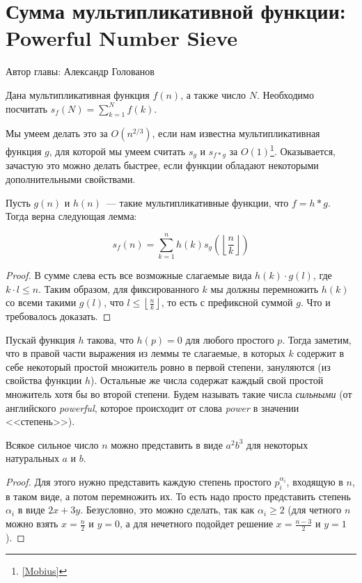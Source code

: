 \chapter{Сумма мультипликативной функции: Powerful Number Sieve}

Автор главы: Александр Голованов

\begin{problem}
 Дана мультипликативная функция $f(n)$, а также число $N$. Необходимо посчитать $s_f(N) = \sum_{k=1}^Nf(k)$.
\end{problem}


Мы умеем делать это за $O(n^{2/3})$, если нам известна мультипликативная функция $g$, для которой мы умеем считать $s_g$ и $s_{f*g}$ за $O(1)$\footnote{\ref{Mobius}}. Оказывается, зачастую это можно делать быстрее, если функции обладают некоторыми дополнительными свойствами.

Пусть $g(n)$ и $h(n)$~--- такие мультипликативные функции, что $f = h*g$. Тогда верна следующая лемма:

\begin{lemma}
    $$s_f(n) = \sum_{k=1}^nh(k)s_g\left(\left\lfloor\frac{n}{k}\right\rfloor\right)$$
\end{lemma}

\begin{proof}
    В сумме слева есть все возможные слагаемые вида $h(k) \cdot g(l)$, где $k \cdot l \le n$. Таким образом, для фиксированного $k$ мы должны перемножить $h(k)$ со всеми такими $g(l)$, что $l \le \left\lfloor \frac{n}{k} \right\rfloor$, то есть с префиксной суммой $g$. Что и требовалось доказать.
\end{proof}

Пускай функция $h$ такова, что $h(p) = 0$ для любого простого $p$.
Тогда заметим, что в правой части выражения из леммы те слагаемые, в которых $k$ содержит в себе некоторый простой множитель ровно в первой степени, зануляются (из свойства функции $h$). Остальные же числа содержат каждый свой простой множитель хотя бы во второй степени. Будем называть такие числа \textit{сильными} (от английского \textit{powerful}, которое происходит от слова \textit{power} в значении <<степень>>).

\begin{lemma}
    Всякое сильное число $n$ можно представить в виде $a^2b^3$ для некоторых натуральных $a$ и $b$.
\end{lemma}

\begin{proof}
    Для этого нужно представить каждую степень простого $p_i^{\alpha_i}$, входящую в $n$, в таком виде, а потом перемножить их. То есть надо просто представить степень $\alpha_i$ в виде $2x + 3y$. Безусловно, это можно сделать, так как $\alpha_i \ge 2$ (для четного $n$ можно взять $x = \frac{n}{2}$ и $y = 0$, а для нечетного подойдет решение $x = \frac{n - 3}{2}$ и $y = 1$).
\end{proof}

